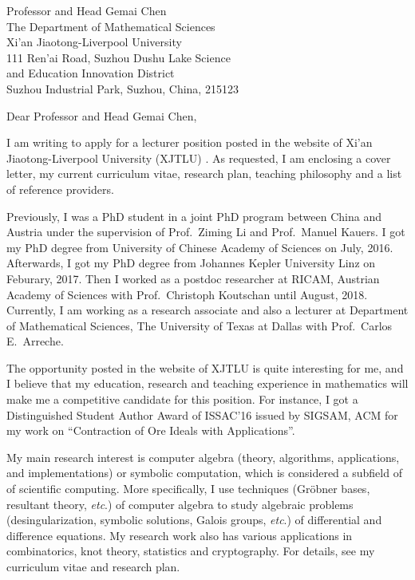 \documentclass[11pt, a4paper]{letter} %
\begin{document}

\begin{letter}{
	Professor and Head Gemai Chen \\
	The Department of Mathematical Sciences\\
	Xi’an Jiaotong-Liverpool University\\
	111 Ren'ai Road, Suzhou Dushu Lake Science \\
	and Education Innovation District \\
	Suzhou Industrial Park, Suzhou, China, 215123
}


\opening{Dear Professor and Head Gemai Chen,}

I am writing to apply for a lecturer position posted in the website of Xi’an Jiaotong-Liverpool University (XJTLU) . 
As requested, I am enclosing a cover letter, my current curriculum vitae, research plan, teaching philosophy and a list of reference providers. 

Previously, I was a PhD student in a joint PhD program between China and Austria under the supervision of Prof.\ Ziming Li and Prof.\ Manuel Kauers. 
I got my PhD degree from University of Chinese Academy of Sciences on July, 2016. 
Afterwards, I got my PhD degree from Johannes Kepler University Linz on Feburary, 2017. 
Then I worked as a postdoc researcher at RICAM, Austrian Academy of Sciences with Prof.\ Christoph Koutschan until August, 2018. Currently, 
I am working as a research associate and also a lecturer at Department of Mathematical Sciences, The University of Texas at Dallas with Prof.\ Carlos E.\ Arreche.

The opportunity posted in the website of XJTLU is quite interesting for me, 
and I believe that my education, research and teaching experience in mathematics will make me a competitive candidate for this position.
For instance, I got a Distinguished Student Author Award of ISSAC'16 issued by SIGSAM, ACM for my work on ``Contraction of Ore Ideals with Applications''. 

My main research interest is computer algebra (theory, algorithms, applications, and implementations) or symbolic computation, 
which  is considered a subfield of  of  scientific computing. More specifically, I use techniques (Gr\"{o}bner bases, resultant theory, {\it etc}.) of computer algebra to 
study algebraic problems (desingularization, symbolic solutions, Galois groups, {\it etc}.) of differential and difference equations. 
My research work also has various applications in combinatorics,  knot theory, statistics and cryptography. For details, see my curriculum vitae and research plan. 


\end{letter}
\end{document}
